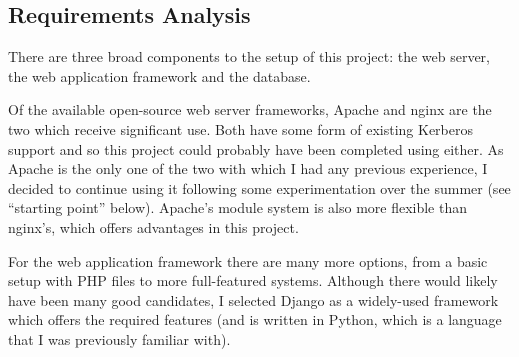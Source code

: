 \documentclass{article}
\begin{document}

\subsection{Requirements Analysis}
There are three broad components to the setup of this project: the web server, the web application framework and the database.

Of the available open-source web server frameworks, Apache and nginx are the two which receive significant use. Both have some form of existing Kerberos support and so this project could probably have been completed using either. As Apache is the only one of the two with which I had any previous experience, I decided to continue using it following some experimentation over the summer (see ``starting point'' below). Apache's module system is also more flexible than nginx's, which offers advantages in this project.

For the web application framework there are many more options, from a basic setup with PHP files to more full-featured systems. Although there would likely have been many good candidates, I selected Django as a widely-used framework which offers the required features (and is written in Python, which is a language that I was previously familiar with).
\end{document}
